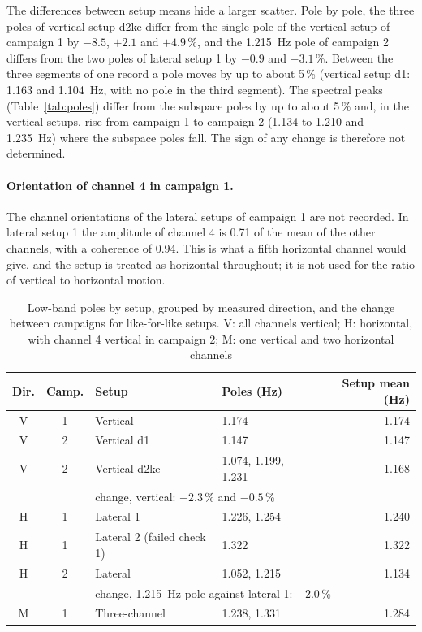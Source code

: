 \documentclass[11pt]{article}
\begin{document}
The differences between setup means hide a larger scatter. Pole by pole, the
three poles of vertical setup d2ke differ from the single pole of the vertical
setup of campaign 1 by $-8.5$, $+2.1$ and $+4.9$\,\%, and the 1.215~Hz pole of
campaign 2 differs from the two poles of lateral setup 1 by $-0.9$ and
$-3.1$\,\%. Between the three segments of one record a pole moves by up to
about 5\,\% (vertical setup d1: 1.163 and 1.104~Hz, with no pole in the third
segment). The spectral peaks (Table~\ref{tab:poles}) differ from the subspace
poles by up to about 5\,\% and, in the vertical setups, rise from campaign 1 to
campaign 2 (1.134 to 1.210 and 1.235~Hz) where the subspace poles fall. The
sign of any change is therefore not determined.

\paragraph{Orientation of channel 4 in campaign 1.} The channel orientations
of the lateral setups of campaign 1 are not recorded. In lateral setup 1 the
amplitude of channel 4 is 0.71 of the mean of the other channels, with a
coherence of 0.94. This is what a fifth horizontal channel would give, and the
setup is treated as horizontal throughout; it is not used for the ratio of
vertical to horizontal motion.

\begin{table}[htbp]
\centering
\caption{Low-band poles by setup, grouped by measured direction, and the change between campaigns for like-for-like setups. V: all channels vertical; H: horizontal, with channel 4 vertical in campaign 2; M: one vertical and two horizontal channels}
\label{tab:shift}
\begin{tabular}{@{}ccllr@{}}
\toprule
Dir. & Camp. & Setup & Poles (Hz) & Setup mean (Hz) \\
\midrule
V & 1 & Vertical & 1.174 & 1.174 \\
V & 2 & Vertical d1 & 1.147 & 1.147 \\
V & 2 & Vertical d2ke & 1.074, 1.199, 1.231 & 1.168 \\
  &   & \multicolumn{3}{l}{change, vertical: $-2.3$\,\% and $-0.5$\,\%} \\
\midrule
H & 1 & Lateral 1 & 1.226, 1.254 & 1.240 \\
H & 1 & Lateral 2 (failed check 1) & 1.322 & 1.322 \\
H & 2 & Lateral & 1.052, 1.215 & 1.134 \\
  &   & \multicolumn{3}{l}{change, 1.215~Hz pole against lateral 1: $-2.0$\,\%} \\
\midrule
M & 1 & Three-channel & 1.238, 1.331 & 1.284 \\
\bottomrule
\end{tabular}
\end{table}
\end{document}
